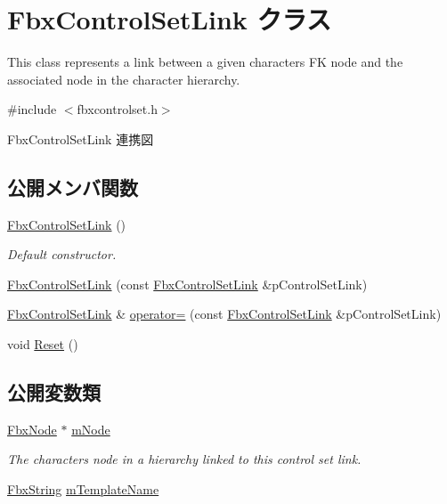 \hypertarget{class_fbx_control_set_link}{}\section{Fbx\+Control\+Set\+Link クラス}
\label{class_fbx_control_set_link}


This class represents a link between a given character\textquotesingle{}s FK node and the associated node in the character hierarchy.  




{\ttfamily \#include $<$fbxcontrolset.\+h$>$}



Fbx\+Control\+Set\+Link 連携図
\subsection*{公開メンバ関数}
\begin{DoxyCompactItemize}
\item 
\hyperlink{class_fbx_control_set_link_ae13e447eaf5a1f794b37d4a4f650377a}{Fbx\+Control\+Set\+Link} ()
\begin{DoxyCompactList}\small\item\em Default constructor. \end{DoxyCompactList}\item 
\hyperlink{class_fbx_control_set_link_a9ecef760859353c34c59d180431ccfe6}{Fbx\+Control\+Set\+Link} (const \hyperlink{class_fbx_control_set_link}{Fbx\+Control\+Set\+Link} \&p\+Control\+Set\+Link)
\item 
\hyperlink{class_fbx_control_set_link}{Fbx\+Control\+Set\+Link} \& \hyperlink{class_fbx_control_set_link_a32de9712bee72685b7447aa23b35bec7}{operator=} (const \hyperlink{class_fbx_control_set_link}{Fbx\+Control\+Set\+Link} \&p\+Control\+Set\+Link)
\item 
void \hyperlink{class_fbx_control_set_link_afedadf6bb18a836a2470636eda93ece9}{Reset} ()
\end{DoxyCompactItemize}
\subsection*{公開変数類}
\begin{DoxyCompactItemize}
\item 
\hyperlink{class_fbx_node}{Fbx\+Node} $\ast$ \hyperlink{class_fbx_control_set_link_a3996e9ed3db015da6c94b9f6c9b7c4f9}{m\+Node}
\begin{DoxyCompactList}\small\item\em The character\textquotesingle{}s node in a hierarchy linked to this control set link. \end{DoxyCompactList}\item 
\hyperlink{class_fbx_string}{Fbx\+String} \hyperlink{class_fbx_control_set_link_ac35309cd74ccd53e6b69273fafafbf7e}{m\+Template\+Name}
\end{DoxyCompactItemize}


